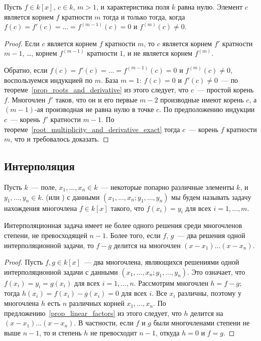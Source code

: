 \begin{theorem}
Пусть $f\in k[x]$, $c\in k$, $m>1$, и характеристика поля $k$ равна
нулю. Элемент $c$ является корнем $f$ кратности $m$ тогда и только
тогда, когда $f(c)=f'(c)=\dots=f^{(m-1)}(c)=0$ и $f^{(m)}(c)\neq 0$.
\end{theorem}
\begin{proof}
Если $c$ является корнем $f$ кратности $m$, то $c$ является корнем
$f'$ кратности $m-1$, \dots, корнем $f^{(m-1)}$ кратности $1$, и не
является корнем $f^{(m)}$.

Обратно, если $f(c)=f'(c)=\dots=f^{(m-1)}(c)=0$ и $f^{(m)}(c)\neq 0$,
воспользуемся индукцией по $m$.
База $m=1$: $f(c)=0$ и $f'(c)\neq 0$~--- по
теореме~\ref{prop_roots_and_derivative} из этого
следует, что $c$~--- простой корень $f$.
Многочлен $f'$ таков, что он и его
первые $m-2$ производные имеют корень $c$, а $(m-1)$-ая производная не
равна нулю в точке $c$. По предположению индукции $c$~--- корень $f'$
кратности $m-1$. По
теореме~\ref{root_multiplicity_and_derivative_exact} тогда $c$~---
корень $f$ кратности $m$, что и требовалось доказать.
\end{proof}

\subsection{Интерполяция}


\begin{definition}
Пусть $k$~--- поле, $x_1,\dots,x_n\in k$~--- некоторые попарно различные
элементы $k$, и $y_1,\dots,y_n\in k$. 
(или ) с
данными $(x_1,\dots,x_n;y_1,\dots,y_n)$ мы будем называть задачу
нахождения многочлена $f\in k[x]$ такого, что $f(x_i)=y_i$ для всех
$i=1,\dots,m$.
\end{definition}

\begin{theorem}
Интерполяционная задача имеет не более одного решения среди
многочленов степени, не превосходящей $n-1$. Более того, если $f$,
$g$~--- два решения одной интерполяционной задачи, то $f-g$ делится на
многочлен $(x-x_1)\dots(x-x_n)$.
\end{theorem}
\begin{proof}
Пусть $f,g\in k[x]$~--- два многочлена,
являющихся решениями одной интерполяционной задачи с
данными $(x_1,\dots,x_n;y_1,\dots,y_n)$. Это означает, что
$f(x_i)=y_i=g(x_i)$ для всех $i=1,\dots,n$. Рассмотрим многочлен
$h=f-g$; тогда $h(x_i)=f(x_i)-g(x_i)=0$ для всех $i$. Все $x_i$
различны, поэтому у многочлена $h$ есть $n$ различных корней
$x_1,\dots,x_n$. По предложению~\ref{prop_linear_factors} из этого
следует, что $h$ делится на $(x-x_1)\dots(x-x_n)$. В частности, если
$f$ и $g$ были многочленами степени не выше $n-1$, то и степень $h$ не
превосходит $n-1$, откуда $h=0$ и $f=g$.
\end{proof}

